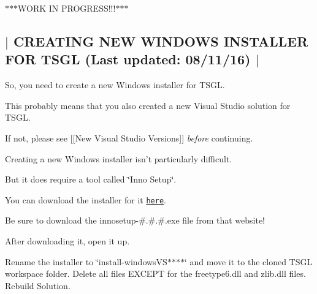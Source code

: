 $\ast$$\ast$$\ast$\-W\-O\-R\-K I\-N P\-R\-O\-G\-R\-E\-S\-S!!!$\ast$$\ast$$\ast$ 

 \subsection*{$\vert$ C\-R\-E\-A\-T\-I\-N\-G N\-E\-W W\-I\-N\-D\-O\-W\-S I\-N\-S\-T\-A\-L\-L\-E\-R F\-O\-R T\-S\-G\-L (Last updated\-: 08/11/16) $\vert$ }

So, you need to create a new Windows installer for T\-S\-G\-L.

This probably means that you also created a new Visual Studio solution for T\-S\-G\-L.

If not, please see \mbox{[}\mbox{[}New Visual Studio Versions\mbox{]}\mbox{]} {\itshape before} continuing.

Creating a new Windows installer isn't particularly difficult.

But it does require a tool called \char`\"{}\-Inno Setup\char`\"{}.

You can download the installer for it \href{http://www.jrsoftware.org/isdl.php}{\tt here}.

Be sure to download the {\ttfamily innosetup-\/\#.\#.\#.exe} file from that website!

After downloading it, open it up.

Rename the installer to \char`\"{}install-\/windows\-V\-S$\ast$$\ast$$\ast$$\ast$\char`\"{} and move it to the cloned T\-S\-G\-L workspace folder. Delete all files E\-X\-C\-E\-P\-T for the freetype6.\-dll and zlib.\-dll files. Rebuild Solution. 